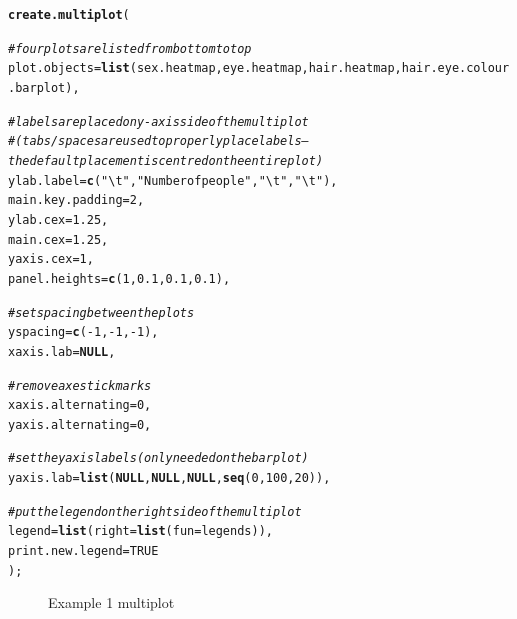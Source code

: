 \documentclass[letterpaper]{report}\usepackage[]{graphicx}\usepackage[]{color}
\makeatletter
\newcommand{\hlnum}[1]{\textcolor[rgb]{0.686,0.059,0.569}{#1}}%
\newcommand{\hlstr}[1]{\textcolor[rgb]{0.192,0.494,0.8}{#1}}%
\newcommand{\hlcom}[1]{\textcolor[rgb]{0.678,0.584,0.686}{\textit{#1}}}%
\newcommand{\hlopt}[1]{\textcolor[rgb]{0,0,0}{#1}}%
\newcommand{\hlstd}[1]{\textcolor[rgb]{0.345,0.345,0.345}{#1}}%
\newcommand{\hlkwa}[1]{\textcolor[rgb]{0.161,0.373,0.58}{\textbf{#1}}}%
\newcommand{\hlkwc}[1]{\textcolor[rgb]{0.333,0.667,0.333}{#1}}%
\newcommand{\hlkwd}[1]{\textcolor[rgb]{0.737,0.353,0.396}{\textbf{#1}}}%
\newenvironment{kframe}{%
 \def\at@end@of@kframe{}%
 \ifinner\ifhmode%
  \def\at@end@of@kframe{\end{minipage}}%
  \begin{minipage}{\columnwidth}%
 \fi\fi%
 \def\FrameCommand##1{\hskip\@totalleftmargin \hskip-\fboxsep
 \colorbox{shadecolor}{##1}\hskip-\fboxsep
     \hskip-\linewidth \hskip-\@totalleftmargin \hskip\columnwidth}%
 \MakeFramed {\advance\hsize-\width
   \@totalleftmargin\z@ \linewidth\hsize
   \@setminipage}}%
 {\par\unskip\endMakeFramed%
 \at@end@of@kframe}
\newenvironment{knitrout}{}{} %
\makeatother
\begin{document}
\begin{knitrout}
\color{fgcolor}\begin{kframe}
\begin{alltt}
 \hlkwd{create.multiplot}\hlstd{(}

         \hlcom{# four plots are listed from bottom to top }
         \hlkwc{plot.objects} \hlstd{=} \hlkwd{list}\hlstd{(sex.heatmap, eye.heatmap, hair.heatmap, hair.eye.colour.barplot),}

         \hlcom{# labels are placed on y-axis side of the multiplot }
         \hlcom{# (tabs/spaces are used to properly place labels -- the default placement is centred on the entire plot)}
         \hlkwc{ylab.label} \hlstd{=} \hlkwd{c}\hlstd{(}\hlstr{"\textbackslash{}t"}\hlstd{,} \hlstr{"Number of people"}\hlstd{,} \hlstr{"\textbackslash{}t"}\hlstd{,} \hlstr{"\textbackslash{}t"}\hlstd{),}
         \hlkwc{main.key.padding} \hlstd{=} \hlnum{2}\hlstd{,}
         \hlkwc{ylab.cex} \hlstd{=} \hlnum{1.25}\hlstd{,}
         \hlkwc{main.cex} \hlstd{=} \hlnum{1.25}\hlstd{,}
         \hlkwc{yaxis.cex} \hlstd{=} \hlnum{1}\hlstd{,}
         \hlkwc{panel.heights} \hlstd{=} \hlkwd{c}\hlstd{(}\hlnum{1}\hlstd{,} \hlnum{0.1}\hlstd{,} \hlnum{0.1}\hlstd{,} \hlnum{0.1}\hlstd{),}

         \hlcom{# set spacing between the plots}
         \hlkwc{yspacing} \hlstd{=} \hlkwd{c}\hlstd{(}\hlopt{-}\hlnum{1}\hlstd{,} \hlopt{-}\hlnum{1}\hlstd{,} \hlopt{-}\hlnum{1}\hlstd{),}
         \hlkwc{xaxis.lab} \hlstd{=} \hlkwa{NULL}\hlstd{,}

         \hlcom{# remove axes tick marks}
         \hlkwc{xaxis.alternating} \hlstd{=} \hlnum{0}\hlstd{,}
         \hlkwc{yaxis.alternating} \hlstd{=} \hlnum{0}\hlstd{,}

         \hlcom{# set the yaxis labels (only needed on the bar plot)}
         \hlkwc{yaxis.lab} \hlstd{=} \hlkwd{list}\hlstd{(}\hlkwa{NULL}\hlstd{,} \hlkwa{NULL}\hlstd{,} \hlkwa{NULL}\hlstd{,} \hlkwd{seq}\hlstd{(}\hlnum{0}\hlstd{,} \hlnum{100}\hlstd{,} \hlnum{20}\hlstd{)),}

         \hlcom{# put the legend on the right side of the multiplot}
         \hlkwc{legend} \hlstd{=} \hlkwd{list}\hlstd{(}\hlkwc{right} \hlstd{=} \hlkwd{list}\hlstd{(}\hlkwc{fun} \hlstd{= legends)),}
         \hlkwc{print.new.legend} \hlstd{=} \hlnum{TRUE}
         \hlstd{);}
\end{alltt}
\end{kframe}\begin{figure}

{\centering {} 

}

\caption[Example 1 multiplot]{Example 1 multiplot\label{fig:multiplotex1_final}}
\end{figure}


\end{knitrout}
\end{document}
